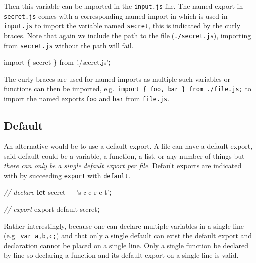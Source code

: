 \documentclass[10pt,]{krantz}
\makeatletter
\newenvironment{Shaded}{\begin{snugshade}}{\end{snugshade}}
\newcommand{\CommentTok}[1]{\textcolor[rgb]{0.37,0.37,0.37}{\textit{#1}}}
\newcommand{\ImportTok}[1]{#1}
\newcommand{\KeywordTok}[1]{\textcolor[rgb]{0.27,0.27,0.27}{\textbf{#1}}}
\newcommand{\NormalTok}[1]{#1}
\newcommand{\OperatorTok}[1]{\textcolor[rgb]{0.43,0.43,0.43}{\textbf{#1}}}
\newcommand{\StringTok}[1]{\textcolor[rgb]{0.5,0.5,0.5}{#1}}
\newenvironment{kframe}{%
\medskip{}
\setlength{\fboxsep}{.8em}
 \def\at@end@of@kframe{}%
 \ifinner\ifhmode%
  \def\at@end@of@kframe{\end{minipage}}%
  \begin{minipage}{\columnwidth}%
 \fi\fi%
 \def\FrameCommand##1{\hskip\@totalleftmargin \hskip-\fboxsep
 \colorbox{shadecolor}{##1}\hskip-\fboxsep
     \hskip-\linewidth \hskip-\@totalleftmargin \hskip\columnwidth}%
 \MakeFramed {\advance\hsize-\width
   \@totalleftmargin\z@ \linewidth\hsize
   \@setminipage}}%
 {\par\unskip\endMakeFramed%
 \at@end@of@kframe}
\renewenvironment{Shaded}{\begin{kframe}}{\end{kframe}}
\makeatother
\begin{document}
Then this variable can be imported in the \texttt{input.js} file. The named export in \texttt{secret.js} comes with a corresponding named import in which is used in \texttt{input.js} to import the variable named \texttt{secret}, this is indicated by the curly braces. Note that again we include the path to the file (\texttt{./secret.js}), importing from \texttt{secret.js} without the path will fail.

\begin{Shaded}
\begin{Highlighting}[]
\ImportTok{import} \OperatorTok{\{}\NormalTok{ secret }\OperatorTok{\}} \ImportTok{from} \StringTok{'./secret.js'}\OperatorTok{;}
\end{Highlighting}
\end{Shaded}

The curly braces are used for named imports as multiple such variables or functions can then be imported, e.g.~\texttt{import\ \{\ foo,\ bar\ \}\ from\ \textquotesingle{}./file.js\textquotesingle{};} to import the named exports \texttt{foo} and \texttt{bar} from \texttt{file.js}.

\hypertarget{webpack-intro-import-export-default}{%
\subsection{Default}\label{webpack-intro-import-export-default}}

An alternative would be to use a default export. A file can have a default export, said default could be a variable, a function, a list, or any number of things but \emph{there can only be a single default export per file}. Default exports are indicated with by succeeding \texttt{export} with \texttt{default}.

\begin{Shaded}
\begin{Highlighting}[]
\CommentTok{// declare}
\KeywordTok{let}\NormalTok{ secret }\OperatorTok{=} \StringTok{'s e c r e t'}\OperatorTok{;}

\CommentTok{// export}
\ImportTok{export} \ImportTok{default}\NormalTok{ secret}\OperatorTok{;}
\end{Highlighting}
\end{Shaded}

Rather interestingly, because one can declare multiple variables in a single line (e.g.~\texttt{var\ a,b,c;}) and that only a single default can exist the default export and declaration cannot be placed on a single line. Only a single function be declared by line so declaring a function and its default export on a single line is valid.
\end{document}
